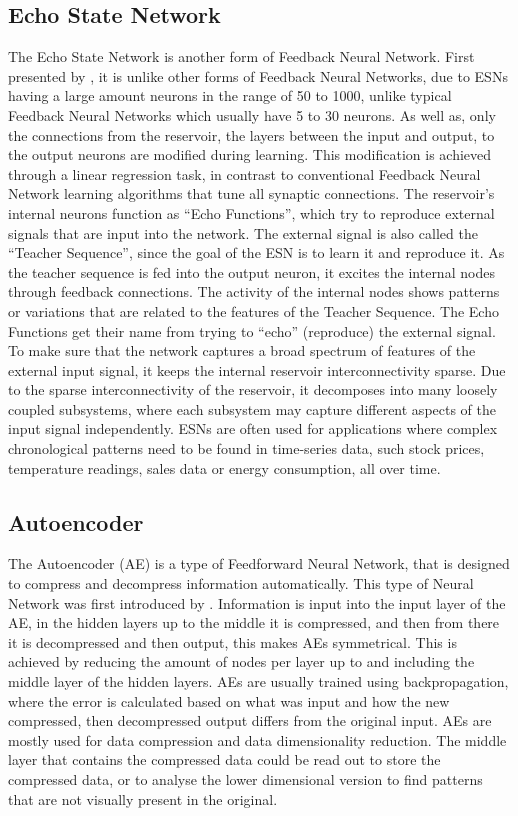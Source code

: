\documentclass[conference]{IEEEtran}
\begin{document}
\subsection{Echo State Network} \label{ESN}
The Echo State Network is another form of Feedback Neural Network. First presented by \cite{jaeger2004harnessing}, it is unlike other forms of Feedback Neural Networks, due to ESNs having a large amount neurons in the range of 50 to 1000, unlike typical Feedback Neural Networks which usually have 5 to 30 neurons. As well as, only the connections from the reservoir, the layers between the input and output, to the output neurons are modified during learning. This modification is achieved through a linear regression task, in contrast to conventional Feedback Neural Network learning algorithms that tune all synaptic connections. The reservoir's internal neurons function as ``Echo Functions'', which try to reproduce external signals that are input into the network. The external signal is also called the ``Teacher Sequence'', since the goal of the ESN is to learn it and reproduce it. As the teacher sequence is fed into the output neuron, it excites the internal nodes through feedback connections. The activity of the internal nodes shows patterns or variations that are related to the features of the Teacher Sequence. The Echo Functions get their name from trying to ``echo'' (reproduce) the external signal. To make sure that the network captures a broad spectrum of features of the external input signal, it keeps the internal reservoir interconnectivity sparse. Due to the sparse interconnectivity of the reservoir, it decomposes into many loosely coupled subsystems, where each subsystem may capture different aspects of the input signal independently. ESNs are often used for applications where complex chronological patterns need to be found in time-series data, such stock prices, temperature readings, sales data or energy consumption, all over time.

\subsection{Autoencoder} \label{AE}
The Autoencoder (AE) is a type of Feedforward Neural Network, that is designed to compress and decompress information automatically. This type of Neural Network was first introduced by \cite{bourlard1988auto}. Information is input into the input layer of the AE, in the hidden layers up to the middle it is compressed, and then from there it is decompressed and then output, this makes AEs symmetrical. This is achieved by reducing the amount of nodes per layer up to and including the middle layer of the hidden layers. AEs are usually trained using backpropagation, where the error is calculated based on what was input and how the new compressed, then decompressed output differs from the original input. AEs are mostly used for data compression and data dimensionality reduction. The middle layer that contains the compressed data could be read out to store the compressed data, or to analyse the lower dimensional version to find patterns that are not visually present in the original.
\end{document}
